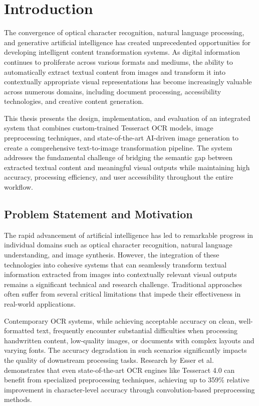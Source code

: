 \chapter{Introduction}

The convergence of optical character recognition, natural language processing, and generative artificial intelligence has created unprecedented opportunities for developing intelligent content transformation systems. As digital information continues to proliferate across various formats and mediums, the ability to automatically extract textual content from images and transform it into contextually appropriate visual representations has become increasingly valuable across numerous domains, including document processing, accessibility technologies, and creative content generation.

This thesis presents the design, implementation, and evaluation of an integrated system that combines custom-trained Tesseract OCR models, image preprocessing techniques, and state-of-the-art AI-driven image generation to create a comprehensive text-to-image transformation pipeline. The system addresses the fundamental challenge of bridging the semantic gap between extracted textual content and meaningful visual outputs while maintaining high accuracy, processing efficiency, and user accessibility throughout the entire workflow.

\section{Problem Statement and Motivation}

The rapid advancement of artificial intelligence has led to remarkable progress in individual domains such as optical character recognition, natural language understanding, and image synthesis. However, the integration of these technologies into cohesive systems that can seamlessly transform textual information extracted from images into contextually relevant visual outputs remains a significant technical and research challenge. Traditional approaches often suffer from several critical limitations that impede their effectiveness in real-world applications.

Contemporary OCR systems, while achieving acceptable accuracy on clean, well-formatted text, frequently encounter substantial difficulties when processing handwritten content, low-quality images, or documents with complex layouts and varying fonts. The accuracy degradation in such scenarios significantly impacts the quality of downstream processing tasks. Research by Esser et al. \cite{esser2020improving} demonstrates that even state-of-the-art OCR engines like Tesseract 4.0 can benefit from specialized preprocessing techniques, achieving up to 359\% relative improvement in character-level accuracy through convolution-based preprocessing methods.

